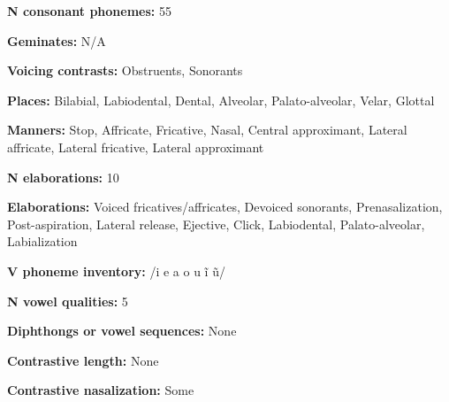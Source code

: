 \begin{styleBody}
\textbf{N consonant phonemes:} 55
\end{styleBody}

\begin{styleBody}
\textbf{Geminates:} N/A
\end{styleBody}

\begin{styleBody}
\textbf{Voicing contrasts:} Obstruents, Sonorants
\end{styleBody}

\begin{styleBody}
\textbf{Places:} Bilabial, Labiodental, Dental, Alveolar, Palato-alveolar, Velar, Glottal
\end{styleBody}

\begin{styleBody}
\textbf{Manners:} Stop, Affricate, Fricative, Nasal, Central approximant, Lateral affricate, Lateral fricative, Lateral approximant
\end{styleBody}

\begin{styleBody}
\textbf{N elaborations:} 10
\end{styleBody}

\begin{styleBody}
\textbf{Elaborations:} Voiced fricatives/affricates, Devoiced sonorants, Prenasalization, Post-aspiration, Lateral release, Ejective, Click, Labiodental, Palato-alveolar, Labialization
\end{styleBody}

\begin{styleBody}
\textbf{V phoneme inventory:} /i e a o u \~{i} \~{u}/
\end{styleBody}

\begin{styleBody}
\textbf{N vowel qualities: }5
\end{styleBody}

\begin{styleBody}
\textbf{Diphthongs or vowel sequences: }None
\end{styleBody}

\begin{styleBody}
\textbf{Contrastive length: }None
\end{styleBody}

\begin{styleBody}
\textbf{Contrastive nasalization: }Some
\end{styleBody}

